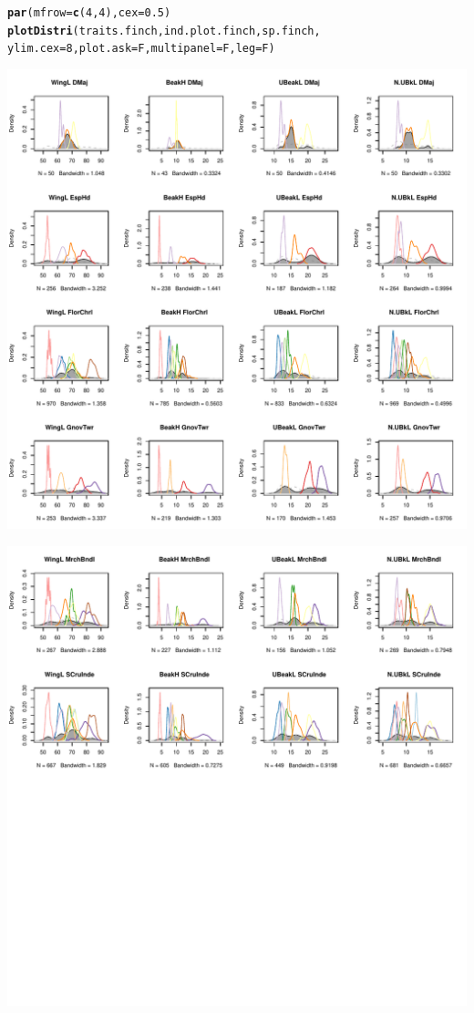 \documentclass[12pt]{article}\usepackage[]{graphicx}\usepackage[]{color}
\makeatletter
\def\maxwidth{ %
  \ifdim\Gin@nat@width>\linewidth
    \linewidth
  \else
    \Gin@nat@width
  \fi
}
\newcommand{\hlnum}[1]{\textcolor[rgb]{0.686,0.059,0.569}{#1}}%
\newcommand{\hlstd}[1]{\textcolor[rgb]{0.345,0.345,0.345}{#1}}%
\newcommand{\hlkwc}[1]{\textcolor[rgb]{0.333,0.667,0.333}{#1}}%
\newcommand{\hlkwd}[1]{\textcolor[rgb]{0.737,0.353,0.396}{\textbf{#1}}}%
\newenvironment{kframe}{%
 \def\at@end@of@kframe{}%
 \ifinner\ifhmode%
  \def\at@end@of@kframe{\end{minipage}}%
  \begin{minipage}{\columnwidth}%
 \fi\fi%
 \def\FrameCommand##1{\hskip\@totalleftmargin \hskip-\fboxsep
 \colorbox{shadecolor}{##1}\hskip-\fboxsep
     \hskip-\linewidth \hskip-\@totalleftmargin \hskip\columnwidth}%
 \MakeFramed {\advance\hsize-\width
   \@totalleftmargin\z@ \linewidth\hsize
   \@setminipage}}%
 {\par\unskip\endMakeFramed%
 \at@end@of@kframe}
\newenvironment{knitrout}{}{} %
\makeatother
\begin{document}
\begin{knitrout}
\color{fgcolor}\begin{kframe}
\begin{alltt}
\hlkwd{par}\hlstd{(}\hlkwc{mfrow} \hlstd{=} \hlkwd{c}\hlstd{(}\hlnum{4}\hlstd{,}\hlnum{4}\hlstd{),} \hlkwc{cex} \hlstd{=} \hlnum{0.5}\hlstd{)}
\hlkwd{plotDistri}\hlstd{(traits.finch, ind.plot.finch, sp.finch,}
           \hlkwc{ylim.cex} \hlstd{=} \hlnum{8}\hlstd{,} \hlkwc{plot.ask} \hlstd{= F,} \hlkwc{multipanel} \hlstd{= F,} \hlkwc{leg} \hlstd{= F)}
\end{alltt}
\end{kframe}
\includegraphics[width=\maxwidth]{figure/unnamed-chunk-11-1} 

\includegraphics[width=\maxwidth]{figure/unnamed-chunk-11-2} 


\end{knitrout}
\end{document}
